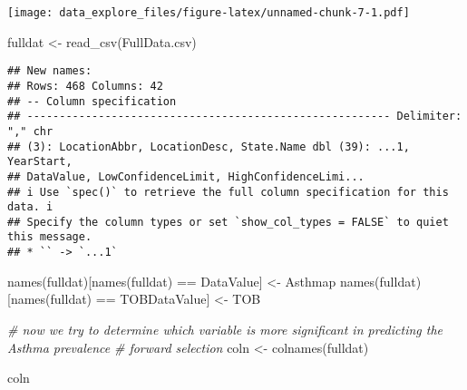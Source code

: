 \documentclass[
]{article}
\newenvironment{Shaded}{\begin{snugshade}}{\end{snugshade}}
\newcommand{\CommentTok}[1]{\textcolor[rgb]{0.56,0.35,0.01}{\textit{#1}}}
\newcommand{\FunctionTok}[1]{\textcolor[rgb]{0.00,0.00,0.00}{#1}}
\newcommand{\NormalTok}[1]{#1}
\newcommand{\OtherTok}[1]{\textcolor[rgb]{0.56,0.35,0.01}{#1}}
\newcommand{\SpecialCharTok}[1]{\textcolor[rgb]{0.00,0.00,0.00}{#1}}
\newcommand{\StringTok}[1]{\textcolor[rgb]{0.31,0.60,0.02}{#1}}
\begin{document}
\texttt{[image: data\_explore\_files/figure-latex/unnamed-chunk-7-1.pdf]}

\begin{Shaded}
\begin{Highlighting}[]
\NormalTok{fulldat }\OtherTok{\textless{}{-}} \FunctionTok{read\_csv}\NormalTok{(}\StringTok{\textquotesingle{}FullData.csv\textquotesingle{}}\NormalTok{)}
\end{Highlighting}
\end{Shaded}

\begin{verbatim}
## New names:
## Rows: 468 Columns: 42
## -- Column specification
## -------------------------------------------------------- Delimiter: "," chr
## (3): LocationAbbr, LocationDesc, State.Name dbl (39): ...1, YearStart,
## DataValue, LowConfidenceLimit, HighConfidenceLimi...
## i Use `spec()` to retrieve the full column specification for this data. i
## Specify the column types or set `show_col_types = FALSE` to quiet this message.
## * `` -> `...1`
\end{verbatim}

\begin{Shaded}
\begin{Highlighting}[]
\FunctionTok{names}\NormalTok{(fulldat)[}\FunctionTok{names}\NormalTok{(fulldat) }\SpecialCharTok{==} \StringTok{\textquotesingle{}DataValue\textquotesingle{}}\NormalTok{] }\OtherTok{\textless{}{-}} \StringTok{\textquotesingle{}Asthmap\textquotesingle{}}
\FunctionTok{names}\NormalTok{(fulldat)[}\FunctionTok{names}\NormalTok{(fulldat) }\SpecialCharTok{==} \StringTok{\textquotesingle{}TOBDataValue\textquotesingle{}}\NormalTok{] }\OtherTok{\textless{}{-}} \StringTok{\textquotesingle{}TOB\textquotesingle{}}


\CommentTok{\# now we try to determine which variable is more significant in predicting the Asthma prevalence}
\CommentTok{\# forward selection}
\NormalTok{coln }\OtherTok{\textless{}{-}} \FunctionTok{colnames}\NormalTok{(fulldat)}

\NormalTok{coln}
\end{Highlighting}
\end{Shaded}
\end{document}
